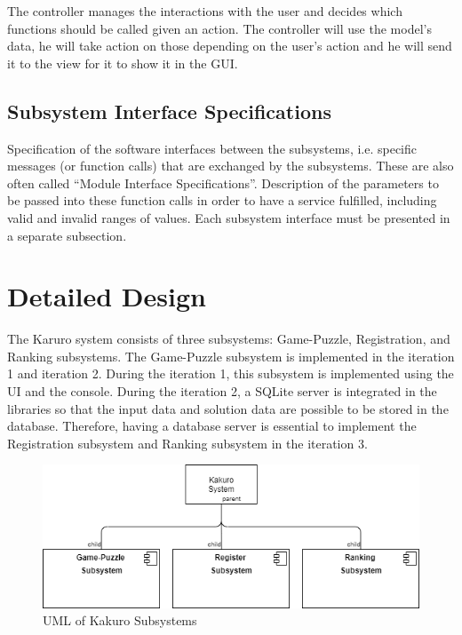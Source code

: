 \documentclass[12pt]{article}
\begin{document}
The controller manages the interactions with the user and decides which functions should be called given an action. The controller will use the model’s data, he will take action on those depending on the user’s action and he will send it to the view for it to show it in the GUI.


\subsection{Subsystem Interface Specifications}

Specification of the software interfaces between the subsystems,
i.e. specific messages (or function calls) that are exchanged by the subsystems.
These are also often called ``Module Interface Specifications''.
Description of the parameters to be passed into these function calls in order to have a service fulfilled,
including valid and invalid ranges of values.
Each subsystem interface must be presented in a separate subsection.

\newpage

\section{Detailed Design} \label{sec:detail}

The Karuro system consists of three subsystems: Game-Puzzle, Registration, and Ranking subsystems. The Game-Puzzle subsystem is implemented in the iteration 1 and iteration 2. During the iteration 1, this subsystem is implemented using the UI and the console. During the iteration 2, a SQLite server is integrated in the libraries so that the input data and solution data are possible to be stored in the database. Therefore, having a database server is essential to implement the Registration subsystem and Ranking subsystem in the iteration 3. 

\begin{figure}[htbp]
    \includegraphics[width=1\textwidth]{Subsystems_UML}
    \caption{UML of Kakuro Subsystems}
    \label{fig:Subsystems_UML}
\end{figure}
\end{document}
